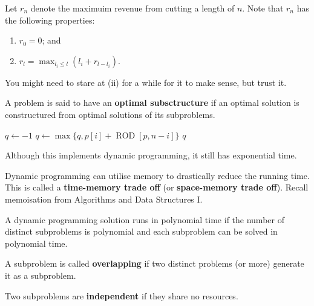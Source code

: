 Let $r_n$ denote the maximuim revenue from cutting a length of $n$. 
Note that $r_n$ has the following properties:
\begin{enumerate}
    \item $r_0 = 0$; and
    \item $r_l = \max_{l_i \leq l}{(l_i + r_{l - l_i})}$.
\end{enumerate}

You might need to stare at (ii) for a while for it to make sense, but trust it.

\begin{definition}
    A problem is said to have an \textbf{optimal subsctructure} if an optimal solution is constructured from optimal solutions of its subproblems.
\end{definition}

\begin{algorithm}
    \hfill
    \begin{algorithmic}[1]
                \State {}
            \EndIf
            \State $q \gets -1$
            \State $q \gets \max\{q, p[i] + \operatorname{ROD}[p, n - i]\}$
            \EndFor
            \State \Return $q$
        \EndProcedure
    \end{algorithmic}
\end{algorithm}

Although this implements dynamic programming, it still has exponential time. 

\begin{remark}
    Dynamic programming can utilise memory to drastically reduce the running time. 
    This is called a \textbf{time-memory trade off} (or \textbf{space-memory trade off}). 
    Recall memoisation from Algorithms and Data Structures I.
\end{remark}

A dynamic programming solution runs in polynomial time if the number of distinct subproblems is polynomial and each subproblem can be solved in polynomial time.

\begin{definition}[Overlapping]
    A subproblem is called \textbf{overlapping} if two distinct problems (or more) generate it as a subproblem.
\end{definition}

\begin{definition}[Independent]
    Two subproblems are \textbf{independent} if they share no resources.
\end{definition}

